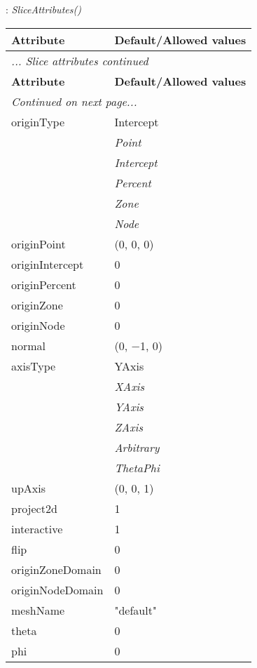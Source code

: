 \documentclass[10pt,a4paper]{report}
\begin{document}
\newpage

{}
: {\it SliceAttributes() }\\[-3mm]

\begin{longtable}{ll}
{\bf Attribute} & {\bf Default/Allowed values} \\
\hline \hline
\endfirsthead
\multicolumn{2}{l}{{\it ... Slice attributes continued}} \\
{\bf Attribute} & {\bf Default/Allowed values} \\
\hline \hline
\endhead
\hline
\multicolumn{2}{l}{{\it Continued on next page...}} \\
\endfoot
\hline
\endlastfoot

originType  &  Intercept   \\
 & {\it  Point} \\
 & {\it  Intercept} \\
 & {\it  Percent} \\
 & {\it  Zone} \\
 & {\it  Node} \\
originPoint  &  (0, 0, 0) \\
originIntercept  &  0 \\
originPercent  &  0 \\
originZone  &  0 \\
originNode  &  0 \\
normal  &  (0, $-$1, 0) \\
axisType  &  YAxis   \\
 & {\it  XAxis} \\
 & {\it  YAxis} \\
 & {\it  ZAxis} \\
 & {\it  Arbitrary} \\
 & {\it  ThetaPhi} \\
upAxis  &  (0, 0, 1) \\
project2d  &  1 \\
interactive  &  1 \\
flip  &  0 \\
originZoneDomain  &  0 \\
originNodeDomain  &  0 \\
meshName  &  "default" \\
theta  &  0 \\
phi  &  0 \\
\end{longtable}

\newpage
\end{document}
